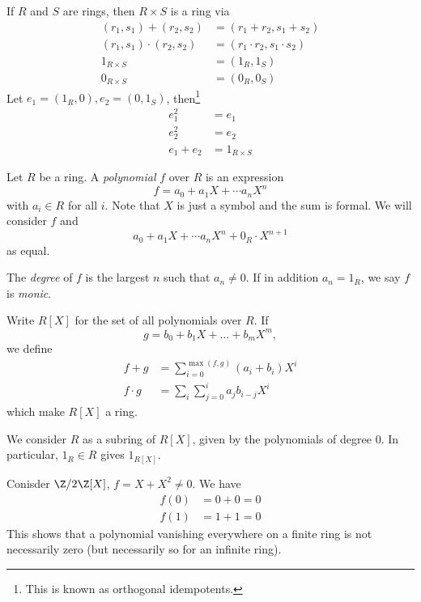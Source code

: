 \documentclass[a4paper]{article}
\theoremstyle{definition}
\begin{document}
\begin{eg}
  If \(R\) and \(S\) are rings, then \(R \times S\) is a ring via
  \begin{align*}
    (r_1, s_1) + (r_2, s_2) &= (r_1 + r_2, s_1 + s_2) \\
    (r_1, s_1) \cdot (r_2, s_2) &= (r_1 \cdot r_2, s_1 \cdot s_2) \\
    1_{R \times S} &= (1_R, 1_S) \\
    0_{R \times S} &= (0_R, 0_S)
  \end{align*}
  Let \(e_1 = (1_R, 0), e_2 = (0, 1_S)\), then\footnote{This is known as orthogonal idempotents.}
  \begin{align*}
    e_1^2 &= e_1 \\
    e_2^2 &= e_2 \\
    e_1 + e_2 &= 1_{R \times S}
  \end{align*}
\end{eg}

\begin{eg}[Polynomial]
  Let \(R\) be a ring. A \emph{polynomial} \(f\) over \(R\) is an expression
  \[
    f = a_0 + a_1X + \cdots a_nX^n
  \]
  with \(a_i \in R\) for all \(i\). Note that \(X\) is just a symbol and the sum is formal. We will consider \(f\) and
  \[
    a_0 + a_1X + \cdots a_nX^n + 0_R \cdot X^{n + 1}
  \]
  as equal.

  The \emph{degree} of \(f\) is the largest \(n\) such that \(a_n \neq 0\). If in addition \(a_n = 1_R\), we say \(f\) is \emph{monic}.

  Write \(R[X]\) for the set of all polynomials over \(R\). If
  \[
    g = b_0 + b_1X + \dots + b_mX^m,
  \]
  we define
  \begin{align*}
    f + g &= \sum_{i = 0}^{\max{(f, g)}} (a_i + b_i)X^i \\
    f \cdot g &= \sum_{i} \sum_{j = 0}^{i} a_j b_{i - j}X^i
  \end{align*}
  which make \(R[X]\) a ring.

  We consider \(R\) as a subring of \(R[X]\), given by the polynomials of degree \(0\). In particular, \(1_R \in R\) gives \(1_{R[X]}\).
\end{eg}

\begin{eg}
  Conisder \(\Z/2\Z[X]\), \(f = X + X^2 \neq 0\). We have
  \begin{align*}
    f(0) &= 0 + 0 = 0 \\
    f(1) &= 1 + 1 = 0
  \end{align*}
  This shows that a polynomial vanishing everywhere on a finite ring is not necessarily zero (but necessarily so for an infinite ring).
\end{eg}
\end{document}
